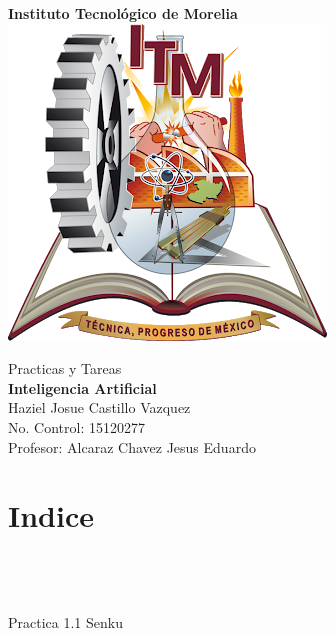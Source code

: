 \documentclass[10pt,a4paper]{report}
\begin{document}
\begin{center}
	{\bf {\huge Instituto Tecnológico de Morelia} }\\ \vspace{1cm} 
	\includegraphics[scale=.7]{logoITM.png} \hspace{6cm} 
\end{center}

\begin{center}
	\vspace{1cm}
	{\huge Practicas y Tareas} \vspace{1cm} \\
	{\bf {\Large Inteligencia Artificial}} \vspace{1cm} \\
	{\Large Haziel Josue Castillo Vazquez}\vspace{1cm} \\
	{\Large No. Control: 15120277} \vspace{2cm} \\
	{\Large Profesor: Alcaraz Chavez Jesus Eduardo}
\end{center}

\pagebreak 

\section*{Indice}
\begin{flushleft}
{ }\\
{ }\\ \hspace{.5cm}
	{ } \\ \hspace{1cm}
		{\sc Practica 1.1 Senku}\\ \hspace{.5cm}
		

\end{flushleft}
\end{document}
